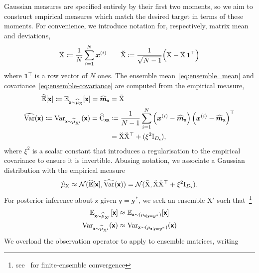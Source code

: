 \documentclass[wcp]{jmlr} %
\newcommand{\Ex}{\mathbb{E}}
\newcommand{\var}{\operatorname{Var}}
\newcommand{\vv}[1]{\boldsymbol{#1}}
\newcommand{\mm}[1]{\mathrm{#1}}
\newcommand{\mmmean}[1]{\bar{\mathrm{#1}}}
\newcommand{\mmdev}[1]{\breve{\mathrm{#1}}}
\newcommand{\rv}[1]{\mathsf{#1}}
\newcommand{\vrv}[1]{\vv{\rv{#1}}}
\newcommand{\Normal}{\mathcal{N}}
\newcommand{\gvn}{\mid}
\begin{document}
Gaussian measures are specified entirely by their first two moments, so we aim to construct empirical measures which match the desired target in terms of these moments.
For convenience, we introduce notation for, respectively, matrix mean and deviations,
\begin{align}
    \mmmean{X} \coloneq \frac{1}{N}\sum_{i=1}^N \vv{x}^{(i)}
    \quad\quad
    \mmdev{X} \coloneq \frac{1}{\sqrt{N-1}} \Bigl( \mm{X} - \mmmean{X}\,\vv{1}^\top \Bigr)
     \label{eq:deviation_matrix}
\end{align}
where \(\vv{1}^\top\) is a row vector of \(N\) ones.
The ensemble mean~\eqref{eq:ensemble_mean} and covariance~\eqref{eq:ensemble-covariance} are computed from the empirical measure,
\begin{align}
    \widehat{\Ex}[\vrv{x}]\coloneq \Ex_{\vrv{x}\sim \ELaw[\mm{X}]}[ \vrv{x}] =\widehat{\vv{m}}_{\vrv{x}}
&=\mmmean{X}\label{eq:ensemble_mean} \\
\widehat{\var}(\vrv{x}) \coloneq\var_{\vrv{x}\sim \ELaw[\mm{X}']} (\vrv{x})=\widehat{\mm{C}}_{\vrv{xx}} &\coloneq \frac{1}{N-1} \sum_{i=1}^{N} \left(\vv{x}^{(i)} - \widehat{\vv{m}}_{\vrv{x}}\right)\left(\vv{x}^{(i)} - \widehat{\vv{m}}_{\vrv{x}}\right)^\top  \\
&=\mmdev{X} \mmdev{X}^\top + (\xi^2\mm{I}_{D_{\vrv{x}}}),\label{eq:ensemble-covariance}
\end{align}
where \(\xi^2\) is a scalar constant that introduces a regularisation to the empirical covariance to ensure it is invertible.
Abusing notation, we associate a Gaussian distribution with the empirical measure
\begin{align}
\ELaw[\mm{X}] \approx \Normal(\widehat{\Ex}[\vrv{x}], \widehat{\var}(\vrv{x})) = \Normal(\mmmean{X}, \mmdev{X} \mmdev{X}^\top + \xi^2\mm{I}_{D_{\vrv{x}}}).
\end{align}
For posterior inference about $\vrv{x}$ given $\vrv{y}=\vv{y}^*$, we seek an ensemble $\mm{X}'$ such that~\footnote{see~\cite{LeGland2011Large,Mandel2011Convergence,Kelly2014Wellposedness,Kwiatkowski2015Convergence,DelMoral2017Stability} for finite-ensemble convergence}
\begin{align}
    \Ex_{\vrv{x}\sim \ELaw[\mm{X}']}[ \vrv{x}] &\approx \Ex_{\vrv{x}\sim (\Law[\vrv{x} \gvn \vrv{y}=\vv{y}^*])} [\vrv{x}]\\
    \var_{\vrv{x}\sim \ELaw[\mm{X}']} (\vrv{x}) &\approx \var_{\vrv{x}\sim (\Law[\vrv{x} \gvn \vrv{y}=\vv{y}^*])} (\vrv{x})
\end{align}
We overload the observation operator to apply to ensemble matrices, writing
\end{document}
